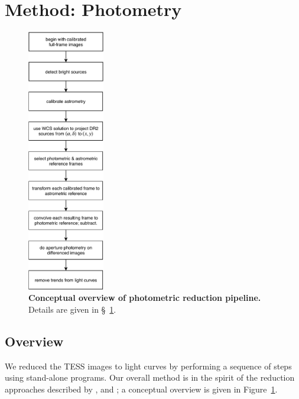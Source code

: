 \documentclass[12pt,twocolumn,tighten]{aastex62}
\begin{document}
\section{Method: Photometry}
\label{sec:method}

\begin{figure}[t]
	\begin{center}
		\leavevmode
		\includegraphics[width=0.3\textwidth]{pipelineoverview.pdf}
	\end{center}
	\vspace{-0.2cm}
	\caption{
    {\bf Conceptual overview of photometric reduction pipeline.}
    Details are given in \S~\ref{sec:method}.
	\label{fig:pipeline}
	}
\end{figure}

\subsection{Overview}

We reduced the TESS images to light curves by performing a sequence of
steps using stand-alone programs.
Our overall method is in the spirit of the reduction approaches described
by \citet{Pal_2009}, \citet{soares-furtado_image_2017} and
\citet{oelkers_precision_2018}; a conceptual overview is given in
Figure~\ref{fig:pipeline}.
\end{document}
